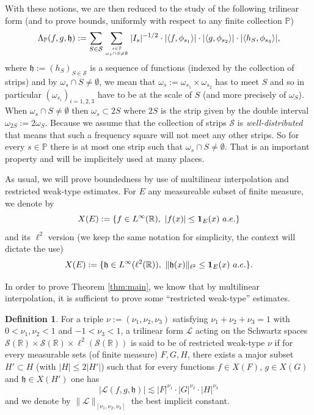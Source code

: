 \documentclass[a4paper,11pt,oneside]{amsart}
\newcommand{\hh}{\mathfrak{h}}
\newcommand{\PP}{\mathbb{P}}
\theoremstyle{plain}
\theoremstyle{definition}
\newtheorem{definition}[theorem]{Definition}
\begin{document}
With these notions, we are then reduced to the study of the following trilinear form (and to prove bounds, uniformly with respect to any finite collection $\PP$)
$$ \Lambda_{\PP}(f,g,\hh ) := \sum_{S \in {\mathcal S}} \sum_{s\in \PP \atop \omega_s \cap S \neq \emptyset} |I_s|^{-1/2} \cdot |\langle f, \phi_{s_1}\rangle| \cdot |\langle g,\phi_{s_2}\rangle| \cdot |\langle h_S, \phi_{s_3}\rangle|,$$  
where $\hh:=(h_S)_{S\in{\mathcal S}}$ is a sequence of functions (indexed by the collection of strips) and by $\omega_s \cap S \neq \emptyset$, we mean that $\omega_s:=\omega_{s_1} \times \omega_{s_2}$ has to meet $S$ and so in particular $(\omega_{s_i})_{i=1,2,3}$ have to be at the scale of $S$ (and more precisely of $\omega_S$). When $\omega_s \cap S\neq \emptyset$ then $\omega_s \subset 2S$ where $2S$ is the strip given by the double interval $\omega_{2S}:=2\omega_{S}$. Because we assume that the collection of strips ${\mathcal S}$ is {\it well-distributed} that means that such a frequency square will not meet any other strips. So for every $s\in\PP$ there is at most one strip such that $\omega_s\cap S\neq \emptyset$. That is an important property and will be implicitely used at many places.


\medskip

As usual, we will prove boundedness by use of multilinear interpolation and restricted weak-type estimates. For $E$ any measureable subset of finite measure, we denote by
$$ X(E):=\{f\in L^{\infty}({\mathbb R}),\ |f(x)|\leq {\bf 1}_{E}(x) \ a.e.\}$$
and its $\ell^2$ version (we keep the same notation for simplicity, the context will dictate the use)
$$ X(E):=\{\hh\in L^{\infty}(\ell^2({\mathbb R})),\ \|\hh(x)\|_{\ell^2}\leq {\bf 1}_{E}(x)\ a.e.\}.$$

In order to prove Theorem \ref{thm:main}, we know that by multilinear interpolation, it is sufficient to prove some ``restricted weak-type'' estimates.


\begin{definition} For a triple $\nu:=(\nu_1,\nu_2,\nu_3)$ satisfying $\nu_1+\nu_2+\nu_3=1$ with $0<\nu_1,\nu_2<1$ and $-1<\nu_3<1$, a trilinear form ${\mathcal L}$ acting on the Schwartz spaces ${\mathcal S}({\mathbb R}) \times {\mathcal S}({\mathbb R}) \times \ell^2({\mathcal S}({\mathbb R}))$ is said to be of restricted weak-type $\nu$ if for every measurable sets (of finite measure) $F,G,H$, there exists a major subset $H'\subset H$ (with $|H|\leq 2|H'|$) such that for every functions $f\in X(F)$, $g\in X(G)$ and $\hh \in X(H')$ one has
$$ \left|{\mathcal L}(f,g,\hh)\right| \lesssim |F|^{\nu_1} \cdot |G|^{\nu_2} \cdot |H|^{\nu_3}$$
and we denote by $\|{\mathcal L}\|_{[\nu_1,\nu_2,\nu_3]}$ the best implicit constant.
\end{definition}
\end{document}
